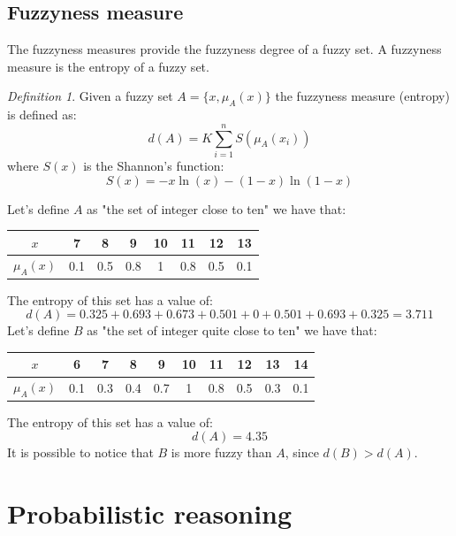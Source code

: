 \documentclass[12pt, a4paper]{report}
\theoremstyle{remark}
\newtheorem*{remark}{Definition}
\begin{document}
    \section{Fuzzyness measure}
    The fuzzyness measures provide the fuzzyness degree of a fuzzy set. A fuzzyness measure is the entropy of a fuzzy set. 
    \begin{remark}
        Given a fuzzy set $A=\{x,\mu_A(x)\}$ the fuzzyness measure (entropy) is defined as:
        \[d(A)=K \sum_{i=1}^{n}S(\mu_A(x_i))\]
        where $S(x)$ is the Shannon's function: 
        \[S(x)=-x \ln(x)-(1-x)\ln(1-x)\]
    \end{remark}
    \begin{example}
        Let's define $A$ as "the set of integer close to ten" we have that:
        \begin{center}
            \begin{tabular}{ | c | c | c | c | c | c | c | c | } 
            \hline
                $x$ & 7 & 8 & 9 & 10 & 11 & 12 & 13 \\ 
            \hline
                $\mu_A(x)$ & 0.1 & 0.5 & 0.8 & 1 & 0.8 & 0.5 & 0.1 \\ 
            \hline
            \end{tabular}
        \end{center}
        The entropy of this set has a value of: 
        \[d(A)=0.325+0.693+0.673+0.501+0+0.501+0.693+0.325=3.711\]
        Let's define $B$ as "the set of integer quite close to ten" we have that:
        \begin{center}
            \begin{tabular}{ | c | c | c | c | c | c | c | c | c | c | } 
            \hline
                $x$ & 6 & 7 & 8 & 9 & 10 & 11 & 12 & 13 & 14 \\ 
            \hline
                $\mu_A(x)$ & 0.1 & 0.3 & 0.4 & 0.7 & 1 & 0.8 & 0.5 & 0.3 & 0.1 \\ 
            \hline
            \end{tabular}
        \end{center}
        The entropy of this set has a value of: 
        \[d(A)=4.35\]
        It is possible to notice that $B$ is more fuzzy than $A$, since $d(B)>d(A)$.    
    \end{example}
    






    \newpage

    \chapter{Probabilistic reasoning}
\end{document}
